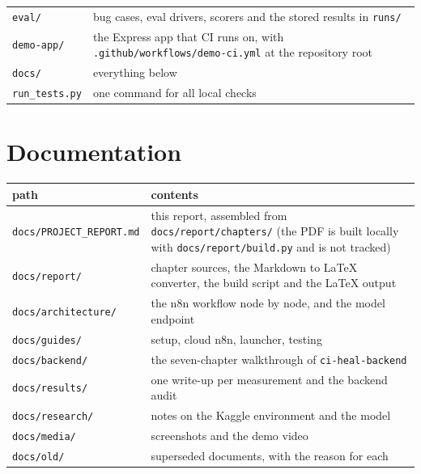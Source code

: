 \documentclass[11pt,a4paper]{report}
\begin{document}
\begin{longtable}{>{\raggedright\arraybackslash}p{0.241\dimexpr\linewidth-4\tabcolsep\relax}>{\raggedright\arraybackslash}p{0.759\dimexpr\linewidth-4\tabcolsep\relax}}
\texttt{eval/\allowbreak{}} & bug cases, eval drivers, scorers and the stored results in \texttt{runs/\allowbreak{}} \\
\texttt{demo-\allowbreak{}app/\allowbreak{}} & the Express app that CI runs on, with \texttt{.\allowbreak{}github/\allowbreak{}workflows/\allowbreak{}demo-\allowbreak{}ci.\allowbreak{}yml} at the repository root \\
\texttt{docs/\allowbreak{}} & everything below \\
\texttt{run\_\allowbreak{}tests.\allowbreak{}py} & one command for all local checks \\
\bottomrule
\end{longtable}

\section{Documentation}

\begin{longtable}{>{\raggedright\arraybackslash}p{0.286\dimexpr\linewidth-4\tabcolsep\relax}>{\raggedright\arraybackslash}p{0.714\dimexpr\linewidth-4\tabcolsep\relax}}
\toprule
\textbf{path} & \textbf{contents} \\
\midrule
\endhead
\texttt{docs/\allowbreak{}PROJECT\_\allowbreak{}REPORT.\allowbreak{}md} & this report, assembled from \texttt{docs/\allowbreak{}report/\allowbreak{}chapters/\allowbreak{}} (the PDF is built locally with \texttt{docs/\allowbreak{}report/\allowbreak{}build.\allowbreak{}py} and is not tracked) \\
\texttt{docs/\allowbreak{}report/\allowbreak{}} & chapter sources, the Markdown to LaTeX converter, the build script and the LaTeX output \\
\texttt{docs/\allowbreak{}architecture/\allowbreak{}} & the n8n workflow node by node, and the model endpoint \\
\texttt{docs/\allowbreak{}guides/\allowbreak{}} & setup, cloud n8n, launcher, testing \\
\texttt{docs/\allowbreak{}backend/\allowbreak{}} & the seven-chapter walkthrough of \texttt{ci-\allowbreak{}heal-\allowbreak{}backend} \\
\texttt{docs/\allowbreak{}results/\allowbreak{}} & one write-up per measurement and the backend audit \\
\texttt{docs/\allowbreak{}research/\allowbreak{}} & notes on the Kaggle environment and the model \\
\texttt{docs/\allowbreak{}media/\allowbreak{}} & screenshots and the demo video \\
\texttt{docs/\allowbreak{}old/\allowbreak{}} & superseded documents, with the reason for each \\
\bottomrule
\end{longtable}
\end{document}
